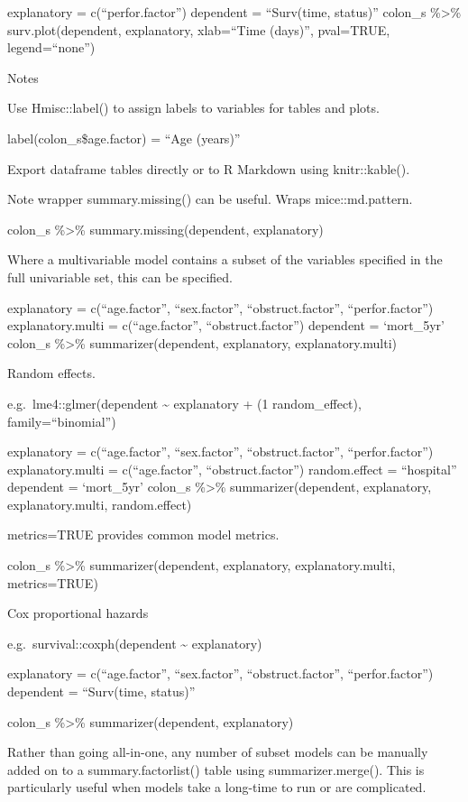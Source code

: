 \documentclass[]{article}
\begin{document}
\begin{landscape}
explanatory = c(``perfor.factor'') dependent = ``Surv(time, status)''
colon\_s \%\textgreater\% surv.plot(dependent, explanatory, xlab=``Time
(days)'', pval=TRUE, legend=``none'')

Notes

Use Hmisc::label() to assign labels to variables for tables and plots.

label(colon\_s\$age.factor) = ``Age (years)''

Export dataframe tables directly or to R Markdown using knitr::kable().

Note wrapper summary.missing() can be useful. Wraps mice::md.pattern.

colon\_s \%\textgreater\% summary.missing(dependent, explanatory)

\end{landscape}

Where a multivariable model contains a subset of the variables specified
in the full univariable set, this can be specified.

explanatory = c(``age.factor'', ``sex.factor'', ``obstruct.factor'',
``perfor.factor'') explanatory.multi = c(``age.factor'',
``obstruct.factor'') dependent = `mort\_5yr' colon\_s \%\textgreater\%
summarizer(dependent, explanatory, explanatory.multi)

Random effects.

e.g.~lme4::glmer(dependent \textasciitilde{} explanatory + (1 \textbar{}
random\_effect), family=``binomial'')

explanatory = c(``age.factor'', ``sex.factor'', ``obstruct.factor'',
``perfor.factor'') explanatory.multi = c(``age.factor'',
``obstruct.factor'') random.effect = ``hospital'' dependent =
`mort\_5yr' colon\_s \%\textgreater\% summarizer(dependent, explanatory,
explanatory.multi, random.effect)

metrics=TRUE provides common model metrics.

colon\_s \%\textgreater\% summarizer(dependent, explanatory,
explanatory.multi, metrics=TRUE)

Cox proportional hazards

e.g.~survival::coxph(dependent \textasciitilde{} explanatory)

explanatory = c(``age.factor'', ``sex.factor'', ``obstruct.factor'',
``perfor.factor'') dependent = ``Surv(time, status)''

colon\_s \%\textgreater\% summarizer(dependent, explanatory)

Rather than going all-in-one, any number of subset models can be
manually added on to a summary.factorlist() table using
summarizer.merge(). This is particularly useful when models take a
long-time to run or are complicated.
\end{document}
